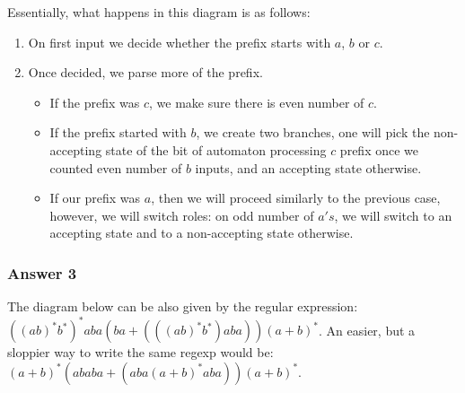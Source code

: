\documentclass[11pt]{article}
\begin{document}

Essentially, what happens in this diagram is as follows:
\begin{enumerate}
\item On first input we decide whether the prefix starts with \(a\), \(b\) or \(c\).
\item Once decided, we parse more of the prefix.
\begin{itemize}
\item If the prefix was \(c\), we make sure there is even number of \(c\).
\item If the prefix started with \(b\), we create two branches, one will pick
the non-accepting state of the bit of automaton processing \(c\) prefix
once we counted even number of \(b\) inputs, and an accepting state
otherwise.
\item If our prefix was \(a\), then we will proceed similarly to the previous
case, however, we will switch roles: on odd number of \(a's\), we will
switch to an accepting state and to a non-accepting state otherwise.
\end{itemize}
\end{enumerate}

\subsubsection{Answer 3}
\label{sec:orgheadline3}
The diagram below can be also given by the regular expression:
\(((ab)^*b^*)^*aba(ba + (((ab)^*b^*)aba))(a + b)^*\).  An easier, but a
sloppier way to write the same regexp would be:
\((a + b)^*(ababa + (aba(a + b)^*aba))(a + b)^*\).
\end{document}
